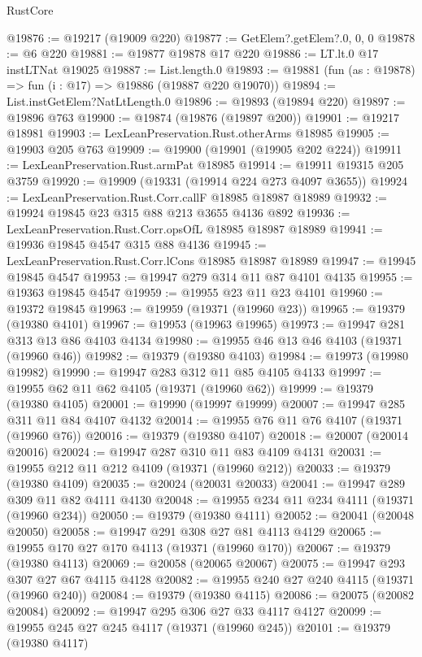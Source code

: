 \begin{lexlean}{RustCore}
\begin{coremodule}
@19876 := @19217 (@19009 @220)
@19877 := GetElem?.getElem?.{0, 0, 0}
@19878 := @6 @220
@19881 := @19877 @19878 @17 @220
@19886 := LT.lt.{0} @17 instLTNat @19025
@19887 := List.length.{0}
@19893 := @19881 (fun (as : @19878) => fun (i : @17) => @19886 (@19887 @220 @19070))
@19894 := List.instGetElem?NatLtLength.{0}
@19896 := @19893 (@19894 @220)
@19897 := @19896 @763
@19900 := @19874 (@19876 (@19897 @200))
@19901 := @19217 @18981
@19903 := LexLeanPreservation.Rust.otherArms @18985
@19905 := @19903 @205 @763
@19909 := @19900 (@19901 (@19905 @202 @224))
@19911 := LexLeanPreservation.Rust.armPat @18985
@19914 := @19911 @19315 @205 @3759
@19920 := @19909 (@19331 (@19914 @224 @273 @4097 @3655))
@19924 := LexLeanPreservation.Rust.Corr.callF @18985 @18987 @18989
@19932 := @19924 @19845 @23 @315 @88 @213 @3655 @4136 @892
@19936 := LexLeanPreservation.Rust.Corr.opsOfL @18985 @18987 @18989
@19941 := @19936 @19845 @4547 @315 @88 @4136
@19945 := LexLeanPreservation.Rust.Corr.lCons @18985 @18987 @18989
@19947 := @19945 @19845 @4547
@19953 := @19947 @279 @314 @11 @87 @4101 @4135
@19955 := @19363 @19845 @4547
@19959 := @19955 @23 @11 @23 @4101
@19960 := @19372 @19845
@19963 := @19959 (@19371 (@19960 @23))
@19965 := @19379 (@19380 @4101)
@19967 := @19953 (@19963 @19965)
@19973 := @19947 @281 @313 @13 @86 @4103 @4134
@19980 := @19955 @46 @13 @46 @4103 (@19371 (@19960 @46))
@19982 := @19379 (@19380 @4103)
@19984 := @19973 (@19980 @19982)
@19990 := @19947 @283 @312 @11 @85 @4105 @4133
@19997 := @19955 @62 @11 @62 @4105 (@19371 (@19960 @62))
@19999 := @19379 (@19380 @4105)
@20001 := @19990 (@19997 @19999)
@20007 := @19947 @285 @311 @11 @84 @4107 @4132
@20014 := @19955 @76 @11 @76 @4107 (@19371 (@19960 @76))
@20016 := @19379 (@19380 @4107)
@20018 := @20007 (@20014 @20016)
@20024 := @19947 @287 @310 @11 @83 @4109 @4131
@20031 := @19955 @212 @11 @212 @4109 (@19371 (@19960 @212))
@20033 := @19379 (@19380 @4109)
@20035 := @20024 (@20031 @20033)
@20041 := @19947 @289 @309 @11 @82 @4111 @4130
@20048 := @19955 @234 @11 @234 @4111 (@19371 (@19960 @234))
@20050 := @19379 (@19380 @4111)
@20052 := @20041 (@20048 @20050)
@20058 := @19947 @291 @308 @27 @81 @4113 @4129
@20065 := @19955 @170 @27 @170 @4113 (@19371 (@19960 @170))
@20067 := @19379 (@19380 @4113)
@20069 := @20058 (@20065 @20067)
@20075 := @19947 @293 @307 @27 @67 @4115 @4128
@20082 := @19955 @240 @27 @240 @4115 (@19371 (@19960 @240))
@20084 := @19379 (@19380 @4115)
@20086 := @20075 (@20082 @20084)
@20092 := @19947 @295 @306 @27 @33 @4117 @4127
@20099 := @19955 @245 @27 @245 @4117 (@19371 (@19960 @245))
@20101 := @19379 (@19380 @4117)

\end{coremodule}
\end{lexlean}
